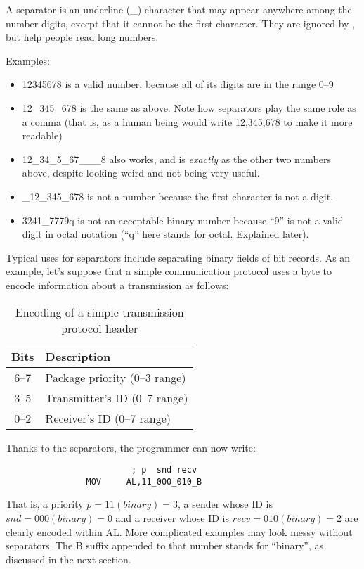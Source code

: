 \documentclass[a4paper,draft,12pt]{book}
\begin{document}
A separator is an underline (\_) character that may appear anywhere
among the number digits, except that it cannot be the first character.
They are ignored by \popasm, but help people read long numbers.

Examples:

\begin{itemize}
\item{12345678} is a valid number, because all of its digits are in the
   range 0--9
\item{12\_345\_678} is the same as above. Note how separators play the
   same role as a comma (that is, as a human being would write 12,345,678
   to make it more readable)
\item{12\_34\_5\_67\_\_\_8} also works, and is \emph{exactly} as the
   other two numbers above, despite looking weird and not being very useful.
\item{\_12\_345\_678} is not a number because the first character is not
   a digit.
\item{3241\_7779q} is not an acceptable binary number because ``9'' is not
	a valid digit in octal notation (``q'' here stands for octal. Explained
	later).
\end{itemize}

Typical uses for separators include separating binary fields of bit
records. As an example, let's suppose that a simple communication
protocol uses a byte to encode information about a transmission as
follows:

\begin{table}[h]
\begin{center}
\begin{tabular}[h]{cl}
Bits & Description\\
\hline
6--7 & Package priority (0--3 range)\\
3--5 & Transmitter's ID (0--7 range)\\
0--2 & Receiver's ID (0--7 range)\\
\hline
\end{tabular}
\caption{Encoding of a simple transmission protocol header}
\end{center}
\end{table}
Thanks to the separators, the programmer can now write:

\begin{verbatim}
                         ; p  snd recv
                MOV     AL,11_000_010_B
\end{verbatim}

That is, a priority $p = 11 (binary) = 3$, a sender whose ID is $snd
= 000 (binary) = 0$ and a receiver whose ID is $recv = 010 (binary)
= 2$ are clearly encoded within AL. More complicated examples may
look messy without separators. The B suffix appended to that
number stands for ``binary'', as discussed in the next section.
\end{document}
